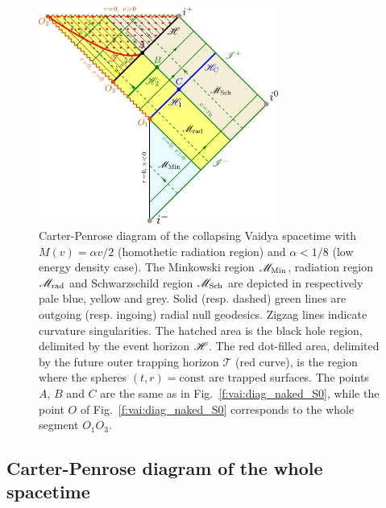 \begin{figure}
\centerline{\includegraphics[width=0.7\textwidth]{vai_CPdiag_nk_sing.pdf}}
\caption[]{\label{f:vai:CPdiag_nk_sing} \footnotesize
Carter-Penrose diagram of the collapsing Vaidya spacetime with
$M(v) = \alpha v /2$ (homothetic radiation region)
and $\alpha < 1/8$ (low energy density case).
The Minkowski region $\mathscr{M}_{\rm Min}$, radiation region $\mathscr{M}_{\rm rad}$
and Schwarzschild region $\mathscr{M}_{\rm Sch}$ are depicted in respectively
pale blue, yellow and grey.
Solid (resp. dashed) green lines are outgoing (resp. ingoing)
radial null geodesics.
Zigzag lines indicate curvature singularities.
The hatched area is the black hole region,
delimited by the event horizon $\mathscr{H}$.
The red dot-filled area, delimited by the future outer trapping horizon
$\mathscr{T}$ (red curve),
is the region where the spheres $(t,r)=\mathrm{const}$
are trapped surfaces.
The points $A$, $B$ and $C$
are the same as in Fig.~\ref{f:vai:diag_naked_S0}, while the point $O$
of Fig.~\ref{f:vai:diag_naked_S0} corresponds to the whole segment
$O_1 O_3$.
}
\end{figure}

\subsection{Carter-Penrose diagram of the whole spacetime}

